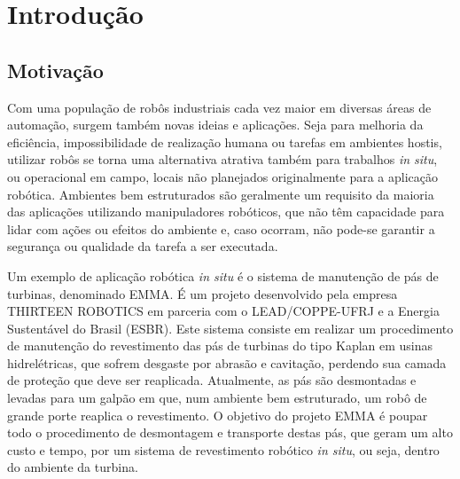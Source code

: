 \chapter{Introdução}

% 

\section{Motivação}

Com uma população de robôs industriais cada vez maior em diversas áreas de
automação, surgem também novas ideias e aplicações. Seja para melhoria da
eficiência, impossibilidade de realização humana ou tarefas em ambientes hostis,
utilizar robôs se torna uma alternativa atrativa também para trabalhos
\textit{in situ}, ou operacional em campo, locais não planejados originalmente
para a aplicação robótica.
Ambientes bem estruturados são geralmente um requisito da maioria das aplicações
utilizando manipuladores robóticos, que não têm capacidade para lidar com ações
ou efeitos do ambiente e, caso ocorram, não pode-se garantir a segurança ou
qualidade da tarefa a ser executada.

Um exemplo de aplicação robótica \textit{in situ} é o sistema de manutenção de
pás de turbinas, denominado EMMA\cite{freitas2017state}.
É um projeto desenvolvido pela empresa THIRTEEN ROBOTICS em parceria com o
LEAD/COPPE-UFRJ e a Energia Sustentável do Brasil (ESBR). Este sistema consiste
em realizar um procedimento de manutenção do revestimento das pás de turbinas do
tipo Kaplan em usinas hidrelétricas, que sofrem desgaste por abrasão e
cavitação, perdendo sua camada de proteção que deve ser reaplicada. Atualmente,
as pás são desmontadas e levadas para um galpão em que, num ambiente bem
estruturado, um robô de grande porte reaplica o revestimento.
O objetivo do projeto EMMA é poupar todo o procedimento de desmontagem e
transporte destas pás, que geram um alto custo e tempo, por um sistema de
revestimento robótico \textit{in situ}, ou seja, dentro do ambiente da turbina.

